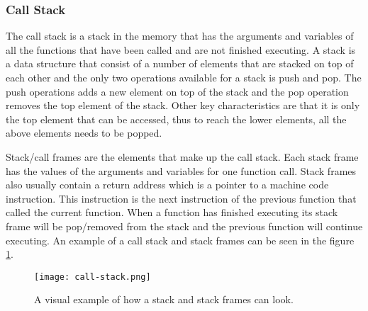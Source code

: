 \subsubsection{Call Stack}
The call stack is a stack in the memory that has the arguments and variables of all the functions that have been called and are not finished executing.
A stack is a data structure that consist of a number of elements that are stacked on top of each other and the only two operations available for a stack is push and pop.
The push operations adds a new element on top of the stack and the pop operation removes the top element of the stack.
Other key characteristics are that it is only the top element that can be accessed, thus to reach the lower elements, all the above elements needs to be popped.


Stack/call frames are the elements that make up the call stack.
Each stack frame has the values of the arguments and variables for one function call.
Stack frames also usually contain a return address which is a pointer to a machine code instruction.
This instruction is the next instruction of the previous function that called the current function.
When a function has finished executing its stack frame will be pop/removed from the stack and the previous function will continue executing. 
An example of a call stack and stack frames can be seen in the figure \ref{fig:callstack}.


\begin{figure}[h]
	\centering
	\texttt{[image: call-stack.png]}
	\caption{A visual example of how a stack and stack frames can look.}
	\label{fig:callstack}
\end{figure}



